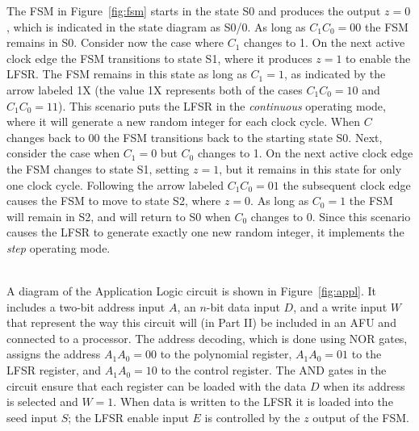 \documentclass[epsfig,10pt,fullpage]{article}
\begin{document}
\noindent
The FSM in Figure~\ref{fig:fsm} starts in the 
state S0 and produces the output $z = 0$, which is indicated in the state diagram
as S0/0. As long as $C_1 C_0 = 00$ the FSM remains in S0. Consider now the
case where $C_1$ changes to 1. On the next active clock edge the FSM transitions to
state S1, where it produces $z=1$ to enable the LFSR. The FSM remains in this state
as long as $C_1 = 1$, as indicated by the arrow labeled 1X (the value 1X
represents both of the cases $C_1 C_0 = 10$ and $C_1 C_0 = 11$). This scenario puts the LFSR
in the {\it continuous} operating mode, where it will generate a new random integer for
each clock cycle.  When $C$ changes back to
00 the FSM transitions back to the starting state S0. Next, consider the case when
$C_1 = 0$ but $C_0$ changes to 1. On the next active clock edge the FSM changes 
to state S1, setting $z=1$, but it remains in this state for only one clock cycle.
Following the arrow labeled $C_1 C_0 = 01$ the subsequent clock edge causes the 
FSM to move to state S2, where $z=0$. As long as $C_0 = 1$ the FSM will remain
in S2, and will return to S0 when $C_0$ changes to 0. Since this scenario causes 
the LFSR to generate exactly one new random integer, it implements the
{\it step} operating mode.

~\\
\noindent
A diagram of the Application Logic circuit is shown in Figure~\ref{fig:appl}. It includes 
a two-bit address input $A$, an $n$-bit data input $D$, and a write input $W$ that represent 
the way this circuit will (in Part II) be included in an AFU and connected to a processor. 
The address decoding, which is done using NOR gates, assigns the address $A_1 A_0 = 00$ to 
the polynomial register, $A_1 A_0 = 01$ to the LFSR register, and $A_1 A_0 = 10$ to the 
control register. The AND gates in the circuit ensure that each register can be loaded with
the data $D$ when its address is selected and $W=1$. When data is written to the LFSR it
is loaded into the seed input $S$; the LFSR enable input $E$ is controlled by the $z$ output 
of the FSM. 
\end{document}

